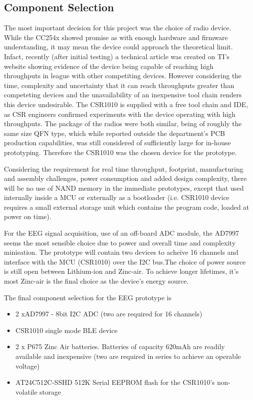 \documentclass[]{article}
\begin{document}
\subsection{Component Selection}

The most important decision for this project was the choice of radio device. While the CC254x showed promise as with enough hardware and firmware understanding, it may mean the device could approach the theoretical limit. Infact, recently (after initial testing) a technical article was created on \ac{TI}'s website \cite{overlapproc} showing evidence of the device being capable of reaching high throughputs in league with other competiting devices. However considering the time, complexity and uncertainty that it can reach throughputs greater than competeting devices and the unavailability of an inexpensive tool chain renders this device undesirable. The CSR1010 is supplied with a free tool chain and \ac{IDE}, as \ac{CSR} engineers confirmed experiments with the device operating with high throughputs. The package of the radios were both similar, being of roughly the same size \ac{QFN} type, which while reported outside the department's \ac{PCB} production capabilities, was still considered of sufficiently large for in-house prototyping. Therefore the CSR1010 was the chosen device for the prototype.

Considering the requirement for real time throughput, footprint, manufacturing and assembly challenges, power consumption and added design complexity, there will be no use of NAND memory in the immediate prototypes, except that used internally inside a \ac{MCU} or externally as a bootloader (i.e. CSR1010 device requires a small external storage unit which contains the program code, loaded at power on time).

For the \ac{EEG} signal acquisition, use of an off-board \ac{ADC} module, the AD7997 seems the most sensible choice due to power and overall time and complexity minisation. The prototype will contain two devices to acheive 16 channels and interface with the \ac{MCU} (CSR1010) over the I2C bus.The choice of power source is still open between Lithium-ion and Zinc-air. To achieve longer lifetimes, it's most Zinc-air is the final choice as the device's energy source.

The final component selection for the \ac{EEG} prototype is
\begin{itemize}
\item 2 xAD7997 - 8bit I2C ADC (two are required for 16 channels)
\item CSR1010 single mode BLE device
\item 2 x P675 Zinc Air batteries. Batteries of capacity 620mAh are readily available and inexpensive (two are required in series to achieve an operable voltage)
\item AT24C512C-SSHD 512K Serial EEPROM flash for the CSR1010's non-volatile storage
\end{itemize}
\end{document}
